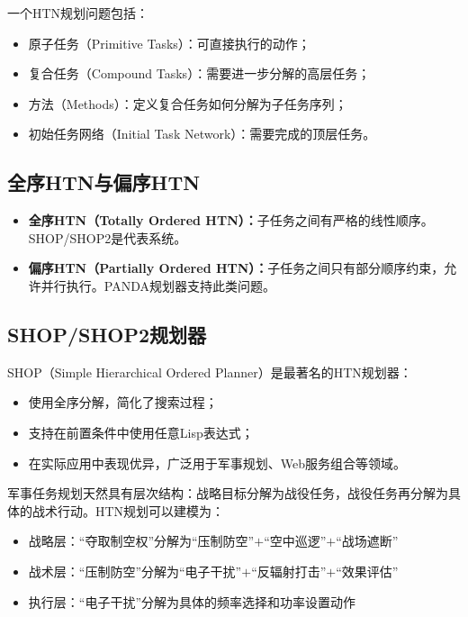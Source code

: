 \begin{definition}[HTN规划]
一个HTN规划问题包括：
\begin{itemize}
  \item 原子任务（Primitive Tasks）：可直接执行的动作；
  \item 复合任务（Compound Tasks）：需要进一步分解的高层任务；
  \item 方法（Methods）：定义复合任务如何分解为子任务序列；
  \item 初始任务网络（Initial Task Network）：需要完成的顶层任务。
\end{itemize}
\end{definition}

\subsection{全序HTN与偏序HTN}

\begin{itemize}
  \item \textbf{全序HTN（Totally Ordered HTN）：}子任务之间有严格的线性顺序。SHOP/SHOP2是代表系统。
  \item \textbf{偏序HTN（Partially Ordered HTN）：}子任务之间只有部分顺序约束，允许并行执行。PANDA规划器支持此类问题。
\end{itemize}

\subsection{SHOP/SHOP2规划器}

SHOP（Simple Hierarchical Ordered Planner）是最著名的HTN规划器：
\begin{itemize}
  \item 使用全序分解，简化了搜索过程；
  \item 支持在前置条件中使用任意Lisp表达式；
  \item 在实际应用中表现优异，广泛用于军事规划、Web服务组合等领域。
\end{itemize}

\begin{appbox}[title={\textbf{应用：军事作战任务规划}}]
军事任务规划天然具有层次结构：战略目标分解为战役任务，战役任务再分解为具体的战术行动。HTN规划可以建模为：
\begin{itemize}
  \item 战略层：``夺取制空权''分解为``压制防空''$+$``空中巡逻''$+$``战场遮断''
  \item 战术层：``压制防空''分解为``电子干扰''$+$``反辐射打击''$+$``效果评估''
  \item 执行层：``电子干扰''分解为具体的频率选择和功率设置动作
\end{itemize}
\end{appbox}

